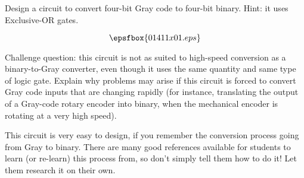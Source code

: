

Design a circuit to convert four-bit Gray code to four-bit binary.  Hint: it uses Exclusive-OR gates.







$$\epsfbox{01411x01.eps}$$

\vskip 10pt

Challenge question: this circuit is not as suited to high-speed conversion as a binary-to-Gray converter, even though it uses the same quantity and same type of logic gate.  Explain why problems may arise if this circuit is forced to convert Gray code inputs that are changing rapidly (for instance, translating the output of a Gray-code rotary encoder into binary, when the mechanical encoder is rotating at a very high speed).







This circuit is very easy to design, if you remember the conversion process going from Gray to binary.  There are many good references available for students to learn (or re-learn) this process from, so don't simply tell them how to do it!  Let them research it on their own.




